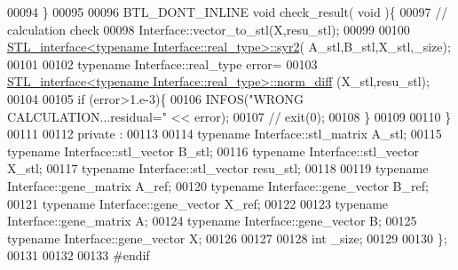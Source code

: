 \begin{DoxyCode}
00094   \}
00095 
00096   BTL\_DONT\_INLINE \textcolor{keywordtype}{void} check\_result( \textcolor{keywordtype}{void} )\{
00097     \textcolor{comment}{// calculation check}
00098     Interface::vector\_to\_stl(X,resu\_stl);
00099 
00100     \hyperlink{class_s_t_l__interface}{STL\_interface<typename Interface::real\_type>::syr2}(
      A\_stl,B\_stl,X\_stl,\_size);
00101 
00102     \textcolor{keyword}{typename} Interface::real\_type error=
00103       \hyperlink{class_s_t_l__interface}{STL\_interface<typename Interface::real\_type>::norm\_diff}
      (X\_stl,resu\_stl);
00104 
00105     \textcolor{keywordflow}{if} (error>1.e-3)\{
00106       INFOS(\textcolor{stringliteral}{"WRONG CALCULATION...residual="} << error);
00107 \textcolor{comment}{//       exit(0);}
00108     \}
00109 
00110   \}
00111 
00112 private :
00113 
00114   \textcolor{keyword}{typename} Interface::stl\_matrix A\_stl;
00115   \textcolor{keyword}{typename} Interface::stl\_vector B\_stl;
00116   \textcolor{keyword}{typename} Interface::stl\_vector X\_stl;
00117   \textcolor{keyword}{typename} Interface::stl\_vector resu\_stl;
00118 
00119   \textcolor{keyword}{typename} Interface::gene\_matrix A\_ref;
00120   \textcolor{keyword}{typename} Interface::gene\_vector B\_ref;
00121   \textcolor{keyword}{typename} Interface::gene\_vector X\_ref;
00122 
00123   \textcolor{keyword}{typename} Interface::gene\_matrix A;
00124   \textcolor{keyword}{typename} Interface::gene\_vector B;
00125   \textcolor{keyword}{typename} Interface::gene\_vector X;
00126 
00127 
00128   \textcolor{keywordtype}{int} \_size;
00129 
00130 \};
00131 
00132 
00133 \textcolor{preprocessor}{#endif}
\end{DoxyCode}
